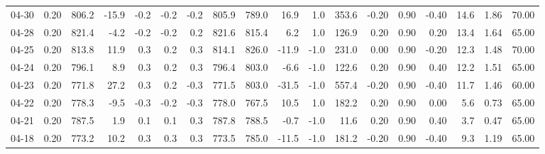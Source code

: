 \begin{threeparttable}
{\begin{tabular}{lrrrrrrrrrrrrrrrrr}
  04-30 &     0.20 & 806.2 &             -15.9 &              -0.2 &               -0.2 &               -0.2 & 805.9 & 789.0 &       16.9 &                      1.0 &               353.6 &      -0.20 &      0.90 &          -0.40 &             14.6 &            1.86 &                  70.00 \\
  04-28 &     0.20 & 821.4 &              -4.2 &              -0.2 &               -0.2 &                0.2 & 821.6 & 815.4 &        6.2 &                      1.0 &               126.9 &       0.20 &      0.90 &           0.20 &             13.4 &            1.64 &                  65.00 \\
  04-25 &     0.20 & 813.8 &              11.9 &               0.3 &                0.2 &                0.3 & 814.1 & 826.0 &      -11.9 &                     -1.0 &               231.0 &       0.00 &      0.90 &          -0.20 &             12.3 &            1.48 &                  70.00 \\
  04-24 &     0.20 & 796.1 &               8.9 &               0.3 &                0.2 &                0.3 & 796.4 & 803.0 &       -6.6 &                     -1.0 &               122.6 &       0.20 &      0.90 &           0.40 &             12.2 &            1.51 &                  65.00 \\
  04-23 &     0.20 & 771.8 &              27.2 &               0.3 &                0.2 &               -0.3 & 771.5 & 803.0 &      -31.5 &                     -1.0 &               557.4 &      -0.20 &      0.90 &          -0.40 &             11.7 &            1.46 &                  60.00 \\
  04-22 &     0.20 & 778.3 &              -9.5 &              -0.3 &               -0.2 &               -0.3 & 778.0 & 767.5 &       10.5 &                      1.0 &               182.2 &       0.20 &      0.90 &           0.00 &              5.6 &            0.73 &                  65.00 \\
  04-21 &     0.20 & 787.5 &               1.9 &               0.1 &                0.1 &                0.3 & 787.8 & 788.5 &       -0.7 &                     -1.0 &                11.6 &       0.20 &      0.90 &           0.40 &              3.7 &            0.47 &                  65.00 \\
  04-18 &     0.20 & 773.2 &              10.2 &               0.3 &                0.3 &                0.3 & 773.5 & 785.0 &      -11.5 &                     -1.0 &               181.2 &      -0.20 &      0.90 &          -0.40 &              9.3 &            1.19 &                  65.00 \\

\end{tabular}}
\end{threeparttable}
